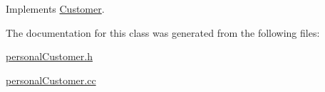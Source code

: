 Implements \hyperlink{classCustomer_a4ef104426d09a4817cb2d55e5e674d0}{Customer}.

The documentation for this class was generated from the following files:\begin{CompactItemize}
\item 
\hyperlink{personalCustomer_8h}{personalCustomer.h}\item 
\hyperlink{personalCustomer_8cc}{personalCustomer.cc}\end{CompactItemize}
